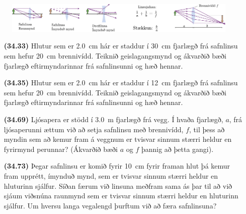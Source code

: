 \begin{tcolorbox}
\begin{figure}[H]
    \centering
    \includegraphics{figures/geislagangur.pdf}
\end{figure}

\end{tcolorbox}

\begin{enumerate}[label = \textbf{(\alph*)}]


\item[\textbf{(34.33)}] Hlutur sem er \SI{2.0}{cm} hár er staddur í \SI{30}{cm} fjarlægð frá safnlinsu sem hefur \SI{20}{cm} brennivídd. Teiknið geislagangsmynd og ákvarðið bæði fjarlægð eftirmyndarinnar frá safnlinsunni og hæð hennar.

\item[\textbf{(34.35)}] Hlutur sem er \SI{2.0}{cm} hár er staddur í \SI{12}{cm} fjarlægð frá safnlinsu sem hefur \SI{20}{cm} brennivídd. Teiknið geislagangsmynd og ákvarðið bæði fjarlægð eftirmyndarinnar frá safnlinsunni og hæð hennar.

\item[\textbf{(34.69)}] Ljósapera er stödd í \SI{3.0}{m} fjarlægð frá vegg. Í hvaða fjarlægð, $a$, frá ljósaperunni ættum við að setja safnlinsu með brennivídd, $f$, til þess að myndin sem að kemur fram á veggnum er tvisvar sinnum stærri heldur en fyrirmynd perunnar? (Ákvarðið bæði $a$ og $f$ þannig að þetta gangi).

\item[\textbf{(34.73)}] Þegar safnlinsu er komið fyrir \SI{10}{cm} fyrir framan hlut þá kemur fram upprétt, ímynduð mynd, sem er tvisvar sinnum stærri heldur en hluturinn sjálfur. Síðan færum við linsuna meðfram sama ás þar til að við sjáum viðsnúna raunmynd sem er tvisvar sinnum stærri heldur en hluturinn sjálfur. Um hversu langa vegalengd þurftum við að færa safnlinsuna?

\end{enumerate}

